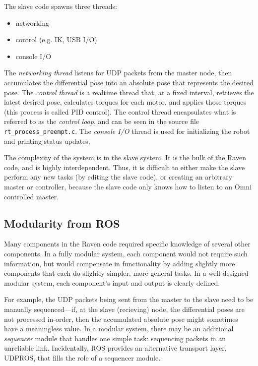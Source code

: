 \documentclass[letterpaper,twocolumn,10pt]{article}
\begin{document}
\vspace{0.5em}
\noindent
The slave code spawns three threads:
\begin{itemize}[noitemsep]
  \item networking
  \item control (e.g. IK, USB I/O)
  \item console I/O
\end{itemize}

The \emph{networking thread} listens for UDP packets from the master
node, then accumulates the differential pose into an absolute pose
that represents the desired pose. The \emph{control thread} is a
realtime thread that, at a fixed interval, retrieves the latest
desired pose, calculates torques for each motor, and applies those
torques (this process is called PID control). The control thread
encapsulates what is referred to as the \emph{control loop}, and can
be seen in the source file \texttt{rt\_process\_preempt.c}. The
\emph{console I/O} thread is used for initializing the robot and
printing status updates.

The complexity of the system is in the slave system. It is the bulk 
of the Raven code, and is highly interdependent. Thus, it is difficult 
to either make the slave perform any new tasks (by editing the slave 
code), or creating an arbitrary master or controller, because the 
slave code only knows how to listen to an Omni controlled master.

\subsection{Modularity from ROS}

Many components in the Raven code required specific knowledge of
several other components. In a fully modular system, each component
would not require such information, but would compensate in
functionality by adding slightly more components that each do slightly
simpler, more general tasks. In a well designed modular system, each
component's input and output is clearly defined.

For example, the UDP packets being sent from the master to the slave
need to be manually sequenced---if, at the slave (recieving) node, the
differential poses are not processed in-order, then the accumulated
absolute pose might sometimes have a meaningless value. In a modular
system, there may be an additional \emph{sequencer} module that
handles one simple task: sequencing packets in an unreliable
link. Incidentally, ROS provides an alternative transport layer, 
UDPROS, that fills the role of a sequencer module.
\end{document}
